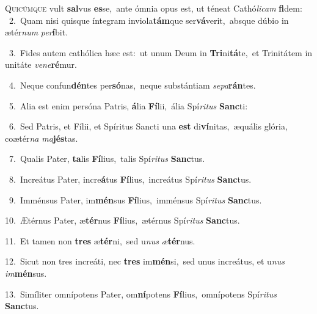 \lettrine{\initial\textcolor{\initialcolor}{Q}}{uicúmque} vult \textbf{sal}\-vus \textbf{es}\-se,~\star ante ómnia opus est, ut téneat Cathó\-\textit{li}\-\textit{cam} \textbf{fi}\-dem:\\
{\numbfont\textcolor{\numbcolor}{~2.}}~Quam nisi quisque íntegram inviola\-\textbf{tám}\-que ser\-\textbf{vá}\-verit,~\star absque dúbio in ætér\textit{num} \textit{per}\-\textbf{í}bit.\par
{\numbfont\textcolor{\numbcolor}{~3.}}~Fides autem cathólica hæc est:~\dagger ut unum Deum in \textbf{Tri}\-ni\-\textbf{tá}\-te,~\star et Trinitátem in unitáte \textit{ve}\-\textit{ne}\textbf{ré}mur.\par
{\numbfont\textcolor{\numbcolor}{~4.}}~Neque confun\-\textbf{dén}\-tes per\-\textbf{só}\-nas,~\star neque substántiam \textit{se}\-\textit{pa}\textbf{rán}tes.\par
{\numbfont\textcolor{\numbcolor}{~5.}}~Alia est enim persóna Patris, \textbf{á}\-lia \textbf{Fí}\-lii,~\star ália Spí\-\textit{ri}\-\textit{tus} \textbf{Sanc}\-ti:\par
{\numbfont\textcolor{\numbcolor}{~6.}}~Sed Patris, et Fílii, et Spíritus Sancti una \textbf{est} di\-\textbf{ví}\-nitas,~\star æquális glória, coætér\textit{na} \textit{ma}\-\textbf{jés}tas.\par
{\numbfont\textcolor{\numbcolor}{~7.}}~Qualis Pater, \textbf{ta}\-lis \textbf{Fí}\-lius,~\star talis Spí\-\textit{ri}\-\textit{tus} \textbf{Sanc}\-tus.\par
{\numbfont\textcolor{\numbcolor}{~8.}}~Increátus Pater, incre\-\textbf{á}\-tus \textbf{Fí}\-lius,~\star increátus Spí\-\textit{ri}\-\textit{tus} \textbf{Sanc}\-tus.\par
{\numbfont\textcolor{\numbcolor}{~9.}}~Imménsus Pater, im\-\textbf{mén}\-sus \textbf{Fí}\-lius,~\star imménsus Spí\-\textit{ri}\-\textit{tus} \textbf{Sanc}\-tus.\par
{\numbfont\textcolor{\numbcolor}{10.}}~Ætérnus Pater, æ\-\textbf{tér}\-nus \textbf{Fí}\-lius,~\star ætérnus Spí\-\textit{ri}\-\textit{tus} \textbf{Sanc}\-tus.\par
{\numbfont\textcolor{\numbcolor}{11.}}~Et tamen non \textbf{tres} æ\-\textbf{tér}\-ni,~\star sed u\textit{nus} \textit{æ}\-\textbf{tér}nus.\par
{\numbfont\textcolor{\numbcolor}{12.}}~Sicut non tres increáti, nec \textbf{tres} im\-\textbf{mén}\-si,~\star sed unus increátus, et u\textit{nus} \textit{im}\-\textbf{mén}sus.\par
{\numbfont\textcolor{\numbcolor}{13.}}~Simíliter omnípotens Pater, om\-\textbf{ní}\-potens \textbf{Fí}\-lius,~\star omnípotens Spí\-\textit{ri}\-\textit{tus} \textbf{Sanc}\-tus.\par
